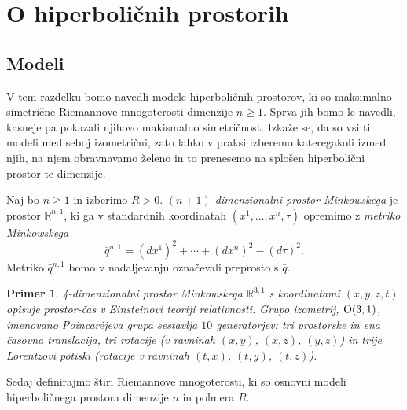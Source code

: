 \documentclass[a4paper]{article}
\newtheorem{primer}{Primer}
\begin{document}
\section{O hiperboličnih prostorih}
\subsection{Modeli}

V tem razdelku bomo navedli modele hiperboličnih prostorov, ki so maksimalno simetrične Riemannove mnogoterosti dimenzije $n \geq 1$. Sprva jih bomo le navedli, kasneje pa pokazali njihovo makismalno simetričnost. Izkaže se, da so vsi ti modeli med seboj izometrični, zato lahko v praksi izberemo kateregakoli izmed njih, na njem obravnavamo želeno in to prenesemo na splošen hiperbolični prostor te dimenzije.

Naj bo $n \geq 1$ in izberimo $R>0$.
\emph{$(n+1)$-dimenzionalni prostor Minkowskega} je prostor $\mathbb{R}^{n,1}$, ki ga v standardnih koordinatah $(x^{1}, \dots , x^{n}, \tau)$ opremimo z \emph{metriko Minkowskega}
\begin{equation}\label{eq:Mink metrika}
\bar{q}^{n,1} = (dx^{1})^2 + \cdots + (dx^{n})^2 - (d\tau)^2.
\end{equation}
Metriko $\bar{q}^{n,1}$ bomo v nadaljevanju označevali preprosto s $\bar{q}$.

\begin{primer}
4-dimenzionalni prostor Minkowskega $\mathbb{R}^{3,1}$ s koordinatami $(x,y,z,t)$ opisuje prostor-čas v Einsteinovi teoriji relativnosti. Grupo izometrij, $\textup{O}(3,1)$, imenovano \emph{Poincar\'ejeva grupa} sestavlja $10$ generatorjev: tri prostorske in ena časovna translacija, tri rotacije (v ravninah $(x,y)$, $(x,z)$, $(y,z)$) in trije Lorentzovi potiski (rotacije v ravninah $(t,x)$, $(t,y)$, $(t,z)$).
\end{primer}

Sedaj definirajmo štiri Riemannove mnogoterosti, ki so osnovni modeli hiperboličnega prostora dimenzije $n$ in polmera $R$.
\end{document}
